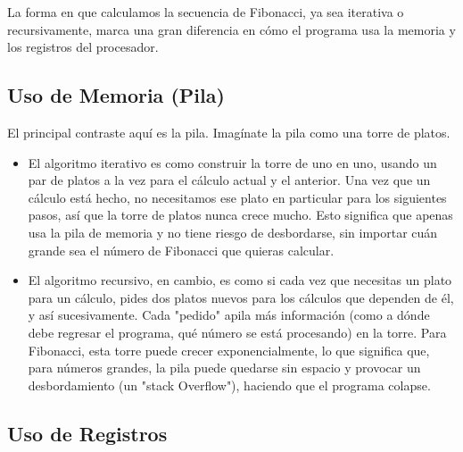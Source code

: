 \documentclass{article}
\begin{document}
La forma en que calculamos la secuencia de Fibonacci, ya sea iterativa o recursivamente, marca una gran diferencia en cómo el programa usa la memoria y los registros del procesador.

\subsection*{Uso de Memoria (Pila)}

El principal contraste aquí es la pila. Imagínate la pila como una torre de platos.
\begin{itemize}
    \item El algoritmo iterativo es como construir la torre de uno en uno, usando un par de platos a la vez para el cálculo actual y el anterior. Una vez que un cálculo está hecho, no necesitamos ese plato en particular para los siguientes pasos, así que la torre de platos nunca crece mucho. Esto significa que apenas usa la pila de memoria y no tiene riesgo de desbordarse, sin importar cuán grande sea el número de Fibonacci que quieras calcular.
    \item El algoritmo recursivo, en cambio, es como si cada vez que necesitas un plato para un cálculo, pides dos platos nuevos para los cálculos que dependen de él, y así sucesivamente. Cada "pedido" apila más información (como a dónde debe regresar el programa, qué número se está procesando) en la torre. Para Fibonacci, esta torre puede crecer exponencialmente, lo que significa que, para números grandes, la pila puede quedarse sin espacio y provocar un desbordamiento (un "stack Overflow"), haciendo que el programa colapse.
\end{itemize}

\subsection*{Uso de Registros}
\end{document}
